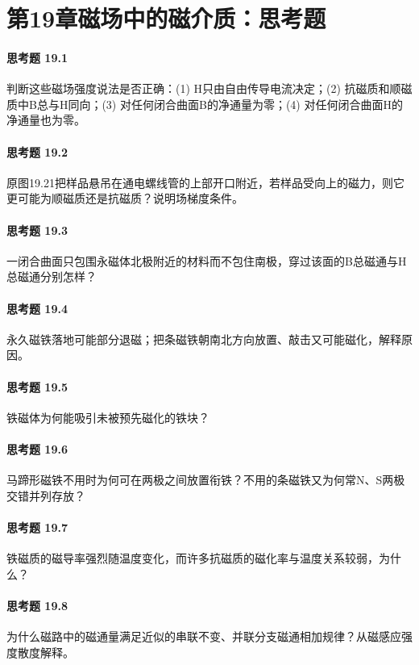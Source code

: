 \section*{第19章\quad 磁场中的磁介质：思考题}
\paragraph{思考题 19.1}
判断这些磁场强度说法是否正确：(1) H只由自由传导电流决定；(2) 抗磁质和顺磁质中B总与H同向；(3) 对任何闭合曲面B的净通量为零；(4) 对任何闭合曲面H的净通量也为零。

\paragraph{思考题 19.2}
原图19.21把样品悬吊在通电螺线管的上部开口附近，若样品受向上的磁力，则它更可能为顺磁质还是抗磁质？说明场梯度条件。

\paragraph{思考题 19.3}
一闭合曲面只包围永磁体北极附近的材料而不包住南极，穿过该面的B总磁通与H总磁通分别怎样？

\paragraph{思考题 19.4}
永久磁铁落地可能部分退磁；把条磁铁朝南北方向放置、敲击又可能磁化，解释原因。

\paragraph{思考题 19.5}
铁磁体为何能吸引未被预先磁化的铁块？

\paragraph{思考题 19.6}
马蹄形磁铁不用时为何可在两极之间放置衔铁？不用的条磁铁又为何常N、S两极交错并列存放？

\paragraph{思考题 19.7}
铁磁质的磁导率强烈随温度变化，而许多抗磁质的磁化率与温度关系较弱，为什么？

\paragraph{思考题 19.8}
为什么磁路中的磁通量满足近似的串联不变、并联分支磁通相加规律？从磁感应强度散度解释。

